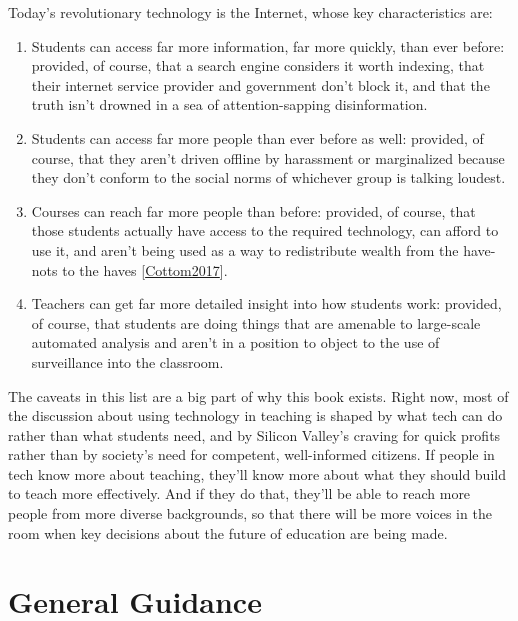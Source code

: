 \documentclass[10pt,statementpaper]{memoir}
\begin{document}
Today's revolutionary technology is the Internet, whose key
characteristics are:

\begin{enumerate}
\def\labelenumi{\arabic{enumi}.}
\item
  Students can access far more information, far more quickly, than ever
  before: provided, of course, that a search engine considers it worth
  indexing, that their internet service provider and government don't
  block it, and that the truth isn't drowned in a sea of
  attention-sapping disinformation.
\item
  Students can access far more people than ever before as well:
  provided, of course, that they aren't driven offline by harassment or
  marginalized because they don't conform to the social norms of
  whichever group is talking loudest.
\item
  Courses can reach far more people than before: provided, of course,
  that those students actually have access to the required technology,
  can afford to use it, and aren't being used as a way to redistribute
  wealth from the have-nots to the haves
  {[}\href{biblio.html\#cottom-lower-ed}{Cottom2017}{]}.
\item
  Teachers can get far more detailed insight into how students work:
  provided, of course, that students are doing things that are amenable
  to large-scale automated analysis and aren't in a position to object
  to the use of surveillance into the classroom.
\end{enumerate}

The caveats in this list are a big part of why this book exists. Right
now, most of the discussion about using technology in teaching is shaped
by what tech can do rather than what students need, and by Silicon
Valley's craving for quick profits rather than by society's need for
competent, well-informed citizens. If people in tech know more about
teaching, they'll know more about what they should build to teach more
effectively. And if they do that, they'll be able to reach more people
from more diverse backgrounds, so that there will be more voices in the
room when key decisions about the future of education are being made.

\section{General Guidance}\label{general-guidance}
\end{document}
